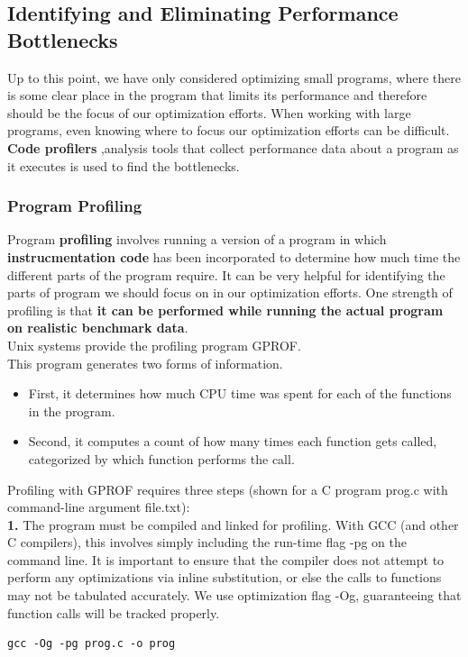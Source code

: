 \documentclass[11pt]{article}
\begin{document}
\subsection{Identifying and Eliminating Performance Bottlenecks}
\label{sec:orgfbb6e8f}

Up to this point, we have only considered optimizing small programs, where there is some clear place in the program that limits its performance and therefore should be the focus of our optimization efforts. When working with large programs, even knowing where to focus our optimization efforts can be difficult. \textbf{Code profilers} ,analysis tools that collect performance data about a program as it executes is used to find the bottlenecks.\\

\subsubsection{Program Profiling}
\label{sec:org8f3e73e}
Program \textbf{profiling} involves running a version of a program in which \textbf{instrucmentation code} has been incorporated to determine how much time the different parts of the program require. It can be very helpful for identifying the parts of program we should focus on in our optimization efforts. One strength of profiling is that \textbf{it can be performed while running the actual program on realistic benchmark data}.\\


Unix systems provide the profiling program GPROF.\\
This program generates two forms of information.\\
\begin{itemize}
\item First, it determines how much CPU time was spent for each of the functions in the program.\\
\item Second, it computes a count of how many times each function gets called, categorized by which function performs the call.\\
\end{itemize}



Profiling with GPROF requires three steps (shown for a C program prog.c with command-line argument file.txt):\\

\textbf{1.} The program must be compiled and linked for profiling. With GCC (and other C compilers), this involves simply including the run-time flag -pg on the command line. It is important to ensure that the compiler does not attempt to perform any optimizations via inline substitution, or else the calls to functions may not be tabulated accurately. We use optimization flag -Og, guaranteeing that function calls will be tracked properly.\\
\begin{verbatim}
gcc -Og -pg prog.c -o prog
\end{verbatim}
\end{document}
